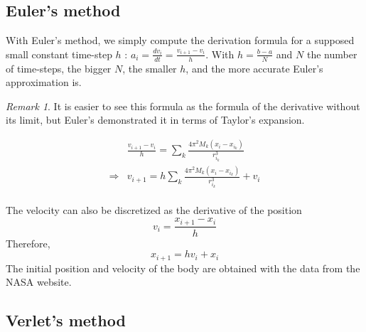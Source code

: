 \documentclass[a4paper, twoside, 11pt]{report}
\theoremstyle{theorem}
\theoremstyle{remark}
\newtheorem{remark}{Remark}[chapter]
\theoremstyle{exemple}
\begin{document}
        \subsection{Euler's method}
            
             With Euler's method, we simply compute the derivation formula for a supposed small constant time-step $h$ : $\displaystyle a_i = \frac{d{v}_{i}}{dt}=\frac{v_{i+1} - v_i}{h}$. With $\displaystyle h = \frac{b-a}{N}$ and $N$ the number of time-steps, the bigger $N$, the smaller $h$, and the more accurate Euler's approximation is.
             
             \begin{remark}
             	It is easier to see this formula as the formula of the derivative without its limit, but Euler's demonstrated it in terms of Taylor's expansion.
			\end{remark}
			 
                \begin{align*}
                     &\frac{v_{i+1} - v_i}{h} = \sum\limits_{k}\frac{4\pi^2M_k(x_i-x_{i_k})}{r_{i_k}^3} \\
                     \Longrightarrow &v_{i+1} = h\sum\limits_{k}\frac{4\pi^2M_k(x_i-x_{i_k})}{r_{i_k}^3} + v_i
                    \tag{8}
                \end{align*}
             \paragraph{}The velocity can also be discretized as the derivative of the position
                \begin{equation*}
                      v_i = \frac{x_{i+1}-x_i}{h}
                  \end{equation*}
             Therefore,
                 \begin{equation*}
                    x_{i+1} = hv_i + x_i
                    \tag{9}
                \end{equation*}   
            The initial position and velocity of the body are obtained with the data from the NASA website.
            
        \subsection{Verlet's method}
\end{document}
